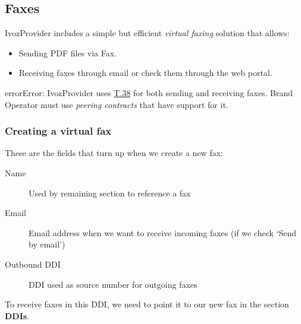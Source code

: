 \documentclass[letterpaper,10pt,spanish]{sphinxmanual}
\begin{document}
\subsection{Faxes}
\label{administration_portal/client/residential/faxes:faxes}\label{administration_portal/client/residential/faxes::doc}\label{administration_portal/client/residential/faxes:faxing-system}
IvozProvider includes a simple but efficient \emph{virtual faxing} solution that allows:
\begin{itemize}
\item {} 
Sending PDF files via Fax.

\item {} 
Receiving faxes through email or check them through the web portal.

\end{itemize}

\begin{notice}{error}{Error:}
IvozProvider uses
\href{http://www.voip-info.org/wiki/view/T.38}{T.38} for both sending and receiving
faxes. Brand Operator must use \emph{peering contracts} that have support for it.
\end{notice}


\subsubsection{Creating a virtual fax}
\label{administration_portal/client/residential/faxes:creating-a-virtual-fax}
These are the fields that turn up when we create a new fax:
\begin{description}
\item[{Name}] \leavevmode{}\label{administration_portal/client/residential/faxes:term-name}
Used by remaining section to reference a fax

\item[{Email}] \leavevmode{}\label{administration_portal/client/residential/faxes:term-email}
Email address when we want to receive incoming faxes (if we check `Send
by email')

\item[{Outbound DDI}] \leavevmode{}\label{administration_portal/client/residential/faxes:term-outbound-ddi}
DDI used as source number for outgoing faxes

\end{description}

To receive faxes in this DDI, we need to point it to our new fax in the section
\textbf{DDIs}.
\end{document}
